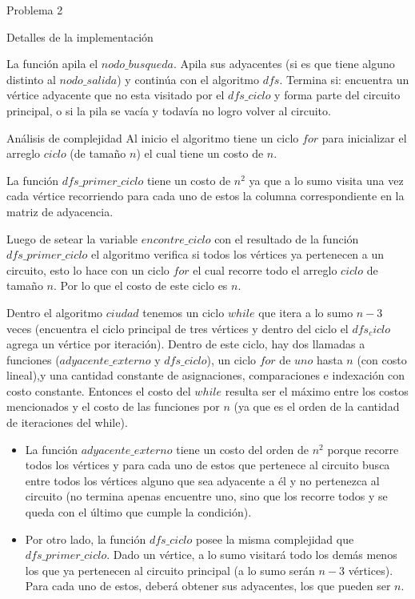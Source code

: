 \begin{section}{Problema 2}
\begin{subsection}{Detalles de la implementación}
\begin{itemize}
			La función apila el $nodo\_busqueda$. Apila sus adyacentes (si es que tiene alguno distinto al $nodo\_salida$) y continúa con el algoritmo $dfs$. Termina si: encuentra un vértice adyacente que no esta visitado por el $dfs\_ciclo$ y forma parte del circuito principal, o si la pila se vacía y todavía no logro volver al circuito.
		\end{itemize}
	\end{subsection}


	\begin{subsection}{Análisis de complejidad}
		Al inicio el algoritmo tiene un ciclo $for$ para inicializar el arreglo $ciclo$ (de tamaño $n$) el cual tiene un costo de $n$.
		
		La función $dfs\_primer\_ciclo$ tiene un costo de $n^2$ ya que a lo sumo visita una vez cada vértice recorriendo para cada uno de estos la columna correspondiente en la matriz de adyacencia.
	
		Luego de setear la variable $encontre\_ciclo$ con el resultado de la función $dfs\_primer\_ciclo$ el algoritmo verifica si todos los vértices ya pertenecen a un circuito, esto lo hace con un ciclo $for$ el cual recorre todo el arreglo $ciclo$ de tamaño $n$. Por lo que el costo de este ciclo es $n$.

		Dentro el algoritmo $ciudad$ tenemos un ciclo $while$ que itera a lo sumo $n-3$ veces (encuentra el ciclo principal de tres vértices y dentro del ciclo el $dfs_ciclo$ agrega un vértice por iteración). Dentro de este ciclo, hay dos llamadas a funciones ($adyacente\_externo$ y $dfs\_ciclo$), un ciclo $for$ de $uno$ hasta $n$ (con costo lineal),y una cantidad constante de asignaciones, comparaciones e indexación con costo constante. Entonces el costo del $while$ resulta ser el máximo entre los costos mencionados y el costo de las funciones por $n$ (ya que es el orden de la cantidad de iteraciones del while).
				
		\begin{itemize}
		\item La función $adyacente\_externo$ tiene un costo del orden de $n^2$ porque recorre todos los vértices y para cada uno de estos que pertenece al circuito busca entre todos los vértices alguno que sea adyacente a él y no pertenezca al circuito (no termina apenas encuentre uno, sino que los recorre todos y se queda con el último que cumple la condición).

		\item Por otro lado, la función $dfs\_ciclo$ posee la misma complejidad que $dfs\_primer\_ciclo$. Dado un vértice, a lo sumo visitará todo los demás menos los que ya pertenecen al circuito principal (a lo sumo serán $n-3$ vértices). Para cada uno de estos, deberá obtener sus adyacentes, los que pueden ser $n$.
		\end{itemize}


\end{subsection}
\end{section}
